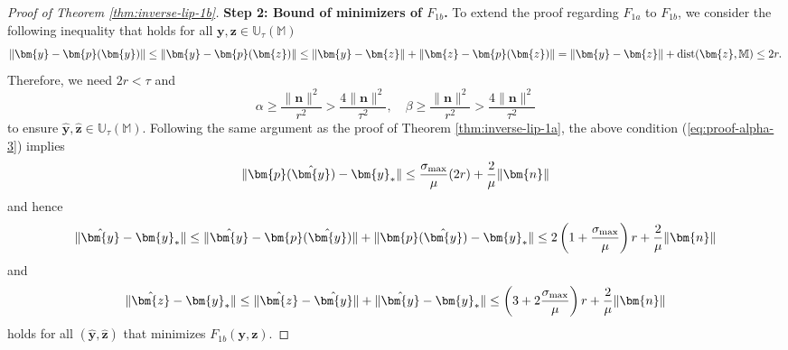 \documentclass{amsart} %
\def\eqref#1{equation~\ref{#1}}
\def\vn{{\bm{n}}}
\def\vp{{\bm{p}}}
\def\vy{{\bm{y}}}
\def\vz{{\bm{z}}}
\def\sM{{\mathbb{M}}}
\def\sU{{\mathbb{U}}}
\theoremstyle{definition}
\theoremstyle{remark}
\renewcommand{\eqref}[1]{\textup{(\ref{#1})}}
\begin{document}
\begin{proof}[Proof of Theorem \ref{thm:inverse-lip-1b}]
\textbf{Step 2: Bound of minimizers of $F_{1b}$.} To extend the proof regarding $F_{1a}$ to $F_{1b}$, we consider the following inequality that holds for all $\vy,\vz \in \sU_{\tau}(\sM)$
\[ \|\vy-\vp(\vy)\| \leq \|\vy-\vp(\vz)\| \leq \|\vy-\vz\| + \|\vz-\vp(\vz)\| = \|\vy-\vz\| + \textup{dist}(\vz,\sM) \leq 2r. \]
Therefore, we need $2r < \tau$ and
\begin{equation}
\label{eq:proof-alpha-3}
  \alpha \geq \frac{\|\vn\|^2}{r^2} > \frac{4\|\vn\|^2}{\tau^2}, \quad \beta \geq \frac{\|\vn\|^2}{r^2}  > \frac{4\|\vn\|^2}{\tau^2} 
\end{equation}
to ensure $\hat{\vy},\hat{\vz} \in \sU_{\tau}(\sM)$. Following the same argument as the proof of Theorem \ref{thm:inverse-lip-1a}, the above condition \eqref{eq:proof-alpha-3} implies
\[
\|\vp(\hat{\vy}) - \vy_\ast \| \leq \frac{\sigma_{\textup{max}}}{\mu} (2r) + \frac{2}{\mu} \|\vn\| 
\]
and hence
\begin{equation}
\label{eq:proof-error-bound-1b}
\|\hat{\vy} - \vy_\ast\| \leq \|\hat{\vy} - \vp(\hat{\vy}) \| + \|\vp(\hat{\vy}) - \vy_\ast \| \leq 2 \left(1 + \frac{\sigma_{\textup{max}}}{\mu} \right) r + \frac{2}{\mu} \|\vn\|
\end{equation}
and
\begin{equation}
\label{eq:proof-error-bound-1b-z}
\|\hat{\vz} - \vy_\ast\| \leq \|\hat{\vz} - \hat{\vy} \| + \|\hat{\vy} - \vy_\ast \| \leq \left(3 + 2 \frac{\sigma_{\textup{max}}}{\mu} \right) r + \frac{2}{\mu} \|\vn\|
\end{equation}
holds for all $(\hat{\vy},\hat{\vz})$ that minimizes $F_{1b}(\vy,\vz)$.


\end{proof}
\end{document}
